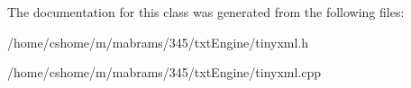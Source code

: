 \-The documentation for this class was generated from the following files\-:\begin{DoxyCompactItemize}
\item 
/home/cshome/m/mabrams/345/txt\-Engine/tinyxml.\-h\item 
/home/cshome/m/mabrams/345/txt\-Engine/tinyxml.\-cpp\end{DoxyCompactItemize}
